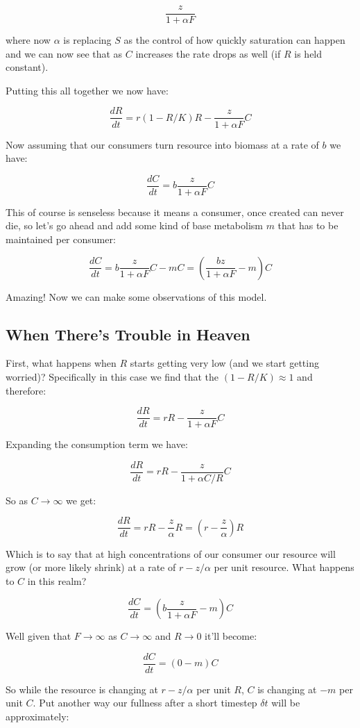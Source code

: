 \documentclass[11pt,a5paper]{book}
\begin{document}
$$\frac{z}{1+\alpha F}$$

where now $\alpha$ is replacing $S$ as the control of how quickly saturation can happen and we can now see that as $C$ increases the rate drops as well (if $R$ is held constant). 

Putting this all together we now have:

$$\frac{dR}{dt} = r(1-R/K)R-\frac{z}{1+\alpha F}C$$

Now assuming that our consumers turn resource into biomass at a rate of $b$ we have:

$$\frac{dC}{dt}=b\frac{z}{1+\alpha F}C$$

This of course is senseless because it means a consumer, once created can never die, so let's go ahead and add some kind of base metabolism $m$ that has to be maintained per consumer:

$$\frac{dC}{dt}=b\frac{z}{1+\alpha F}C-mC=\left(\frac{bz}{1+\alpha F} - m\right)C$$

Amazing! Now we can make some observations of this model. 

\subsection{When There's Trouble in Heaven}

First, what happens when $R$ starts getting very low (and we start getting worried)? Specifically in this case we find that the $(1-R/K) \approx 1$ and therefore:

$$\frac{dR}{dt} = rR-\frac{z}{1+\alpha F}C$$

Expanding the consumption term we have:

$$\frac{dR}{dt} = rR-\frac{z}{1+\alpha C/R}C$$

So as $C\rightarrow \infty$ we get:


$$\frac{dR}{dt} = rR-\frac{z}{\alpha}R=\left(r - \frac{z}{\alpha}\right)R$$

Which is to say that at high concentrations of our consumer our resource will grow (or more likely shrink) at a rate of $r-z/\alpha$ per unit resource. What happens to $C$ in this realm? 

$$\frac{dC}{dt}=\left( b\frac{z}{1+\alpha F}-m \right)C$$

Well given that $F\rightarrow \infty$ as $C \rightarrow \infty$ and $R\rightarrow 0$ it'll become:

$$\frac{dC}{dt}=\left( 0-m \right)C$$

So while the resource is changing at $r-z/\alpha$ per unit $R$, $C$ is changing at $-m$ per unit $C$. Put another way our fullness after a short timestep $\delta t$ will be approximately:
\end{document}
